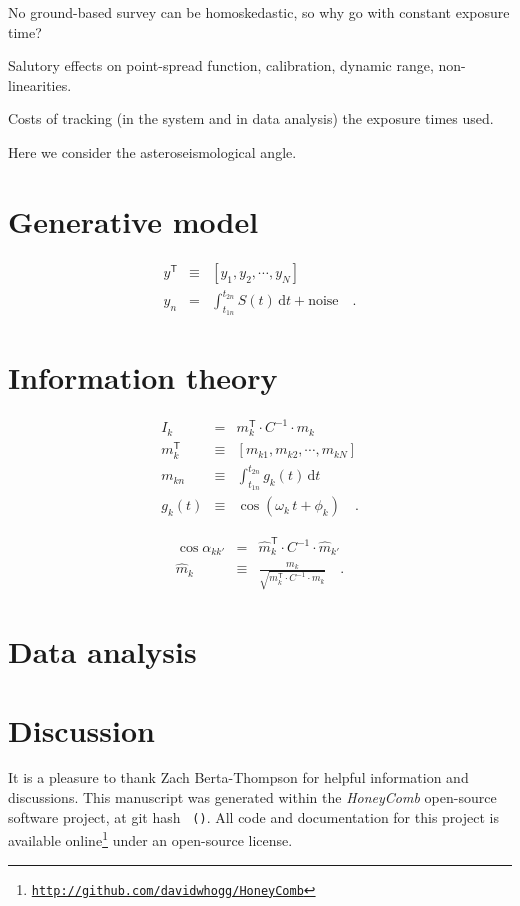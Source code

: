 \documentclass[12pt, preprint]{aastex}
\newcommand{\giturl}{\url{http://github.com/davidwhogg/HoneyComb}}
\newcommand{\project}[1]{\textsl{#1}}
\newcommand{\dd}{\mathrm{d}}
\newcommand{\transpose}[1]{{#1}^{\mathsf{T}}}
\newcommand{\inverse}[1]{{#1}^{-1}}
\begin{document}
No ground-based survey can be homoskedastic, so why go with constant exposure time?

Salutory effects on point-spread function, calibration, dynamic range, non-linearities.

Costs of tracking (in the system and in data analysis) the exposure times used.

Here we consider the asteroseismological angle.

\section{Generative model}

\begin{eqnarray}
\transpose{y} &\equiv& [y_{1}, y_{2}, \cdots , y_{N}]
\\
y_{n} &=& \int_{t_{1n}}^{t_{2n}} S(t)\,\dd t + \mbox{noise}
\quad.
\end{eqnarray}

\section{Information theory}

\begin{eqnarray}
I_{k} &=& \transpose{m}_{k}\cdot\inverse{C}\cdot m_{k}
\\
\transpose{m}_{k} &\equiv& [m_{k1}, m_{k2}, \cdots , m_{kN}]
\\
m_{kn} &\equiv& \int_{t_{1n}}^{t_{2n}} g_{k}(t)\,\dd t
\\
g_{k}(t) &\equiv& \cos(\omega_{k}\,t + \phi_{k})
\quad .
\end{eqnarray}

\begin{eqnarray}
\cos\alpha_{kk'} &=& \transpose{\hat{m}}_{k}\cdot\inverse{C}\cdot\hat{m}_{k'}
\\
\hat{m}_{k} &\equiv& \frac{m_{k}}{\sqrt{\transpose{m}_{k}\cdot\inverse{C}\cdot m_{k}}}
\quad .
\end{eqnarray}

\section{Data analysis}

\section{Discussion}

\acknowledgements
It is a pleasure to thank Zach Berta-Thompson for helpful information
and discussions.
This manuscript was generated within the \project{HoneyComb}
open-source software project, at git hash
\texttt{\githash~(\gitdate)}.
All code and documentation for this project is available
online\footnote{\texttt{\giturl}} under an open-source license.
\end{document}
